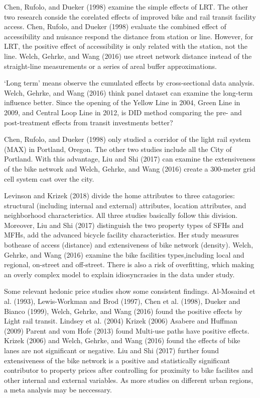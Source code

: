 \documentclass[12pt,]{article}
\begin{document}
Chen, Rufolo, and Dueker (1998) examine the simple effects of LRT. The
other two research conside the corelated effects of improved bike and
rail transit facility access. Chen, Rufolo, and Dueker (1998) evaluate
the combined effect of accessibility and nuisance respond the distance
from station or line. However, for LRT, the positive effect of
accessibility is only related with the station, not the line. Welch,
Gehrke, and Wang (2016) use street network distance instead of the
straight-line measurements or a series of areal buffer approximations.

`Long term' means observe the cumulated effects by cross-sectional data
analysis. Welch, Gehrke, and Wang (2016) think panel dataset can examine
the long-term influence better. Since the opening of the Yellow Line in
2004, Green Line in 2009, and Central Loop Line in 2012, is DID method
comparing the pre- and post-treatment effects from transit investments
better?

Chen, Rufolo, and Dueker (1998) only studied a corridor of the light
rail system (MAX) in Portland, Oregon. The other two studies include all
the City of Portland. With this advantage, Liu and Shi (2017) can
examine the extensiveness of the bike network and Welch, Gehrke, and
Wang (2016) create a 300-meter grid cell system cast over the city.

Levinson and Krizek (2018) divide the home attributes to three
catagories: structural (including internal and external) attributes,
location attributes, and neighborhood characteristics. All three studies
basically follow this division. Moreover, Liu and Shi (2017) distinguish
the two property types of SFHs and MFHs, add the advanced bicycle
facility characteristics. Her study measures bothease of access
(distance) and extensiveness of bike network (density). Welch, Gehrke,
and Wang (2016) examine the bike facilities types,including local and
regional, on-street and off-street. There is also a risk of overfitting,
which making an overly complex model to explain idiosyncrasies in the
data under study.

Some relevant hedonic price studies show some consistent findings.
Al-Mosaind et al. (1993), Lewis-Workman and Brod (1997), Chen et al.
(1998), Dueker and Bianco (1999), Welch, Gehrke, and Wang (2016) found
the positive effects by Light rail transit. Lindsey et al. (2004) Krizek
(2006) Asabere and Huffman (2009) Parent and vom Hofe (2013) found
Multi-use paths have positive effects. Krizek (2006) and Welch, Gehrke,
and Wang (2016) found the effects of bike lanes are not significant or
negative. Liu and Shi (2017) further found extensiveness of the bike
network is a positive and statistically significant contributor to
property prices after controlling for proximity to bike facilites and
other internal and external variables. As more studies on different
urban regions, a meta analysis may be neccessary.
\end{document}
